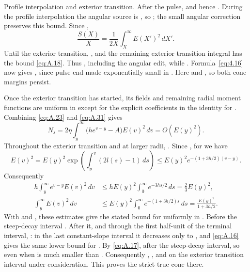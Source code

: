 Profile interpolation and exterior transition. After the pulse,
 and hence . During the profile
interpolation the angular source is , so
; the small  angular
correction preserves this bound. Since ,
\begin{equation}
 \frac{S(X)}{X}=\frac1{2X}\int_X^\infty E(X')^2\,dX'.
 \tag{A.31}\label{eq:A.31}
\end{equation}
Until the exterior transition, , and the remaining
exterior transition integral has the bound \eqref{eq:A.18}. Thus
, including the angular edit, while
. Formula~\eqref{eq:4.16} now gives
, since pulse end made
 exponentially small in . Here
 and
, so both cone margins persist.

Once the exterior transition has started, its fields and remaining radial moment functions are
uniform in  except for the explicit coefficients in the identity for
. Combining
%
\eqref{eq:A.23} and \eqref{eq:A.31} gives
\[
 N_s=2\eta\int_y^\infty\bigl(he^{v-y}-A\bigr)E(v)^2\,dv=O(E(y)^2).
\]
Throughout the exterior transition and at larger radii,
. Since
, for  we have
\[
 E(v)^2=E(y)^2\exp\!\left(\int_y^v(2l(s)-1)\,ds\right)
 \leq E(y)^2e^{-(1+3h/2)(v-y)}.
\]
Consequently
\[
\begin{aligned}
 h\int_y^\infty e^{v-y}E(v)^2\,dv
   &\leq hE(y)^2\int_0^\infty e^{-3hs/2}\,ds=\frac23E(y)^2,\\
 \int_y^\infty E(v)^2\,dv
   &\leq E(y)^2\int_0^\infty e^{-(1+3h/2)s}\,ds
     =\frac{E(y)^2}{1+3h/2}.
\end{aligned}
\]
With  and , these estimates
give the stated bound for  uniformly in
. Before the steep-decay interval
. After it, and through the first half-unit of the
terminal interval, : in the last constant-slope interval it
decreases only to , and \eqref{eq:A.16} gives the same
lower bound for . By \eqref{eq:A.17},
 after the steep-decay interval, so
 even when  is much smaller than
. Consequently ,
, and  on the exterior transition
interval under consideration. This proves the strict true cone there.

